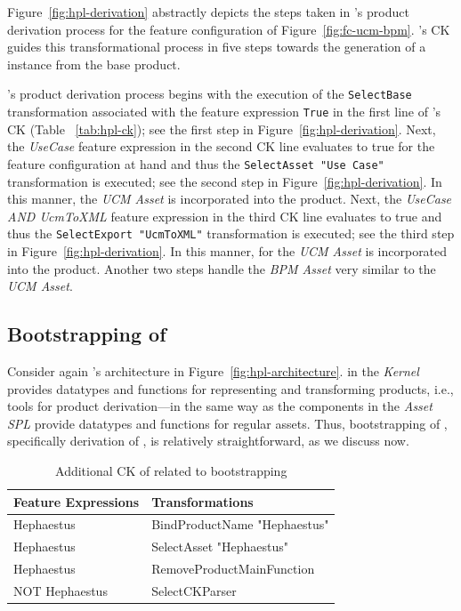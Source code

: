 
Figure~\ref{fig:hpl-derivation} abstractly depicts the steps taken in \hpl's product derivation process 
for the feature configuration of Figure~\ref{fig:fc-ucm-bpm}. \hpl{}'s CK guides this transformational process in five steps towards the generation of a \hpl{} instance from the base product.

\hpl's product derivation process begins with the execution of the \texttt{SelectBase} transformation associated with the feature expression \texttt{True} in the first line of \hpl's CK (Table ~\ref{tab:hpl-ck}); see the first step in Figure~\ref{fig:hpl-derivation}. Next, the \emph{UseCase} feature expression in the second CK line evaluates to true for the feature configuration at hand and thus the \texttt{SelectAsset "Use Case"} transformation is executed; see the second step in Figure~\ref{fig:hpl-derivation}. In this manner, the \emph{UCM Asset} is incorporated into the product. 
Next, the \emph{UseCase AND UcmToXML} feature expression in the third CK line evaluates to true and thus the \texttt{SelectExport "UcmToXML"} transformation is executed; see the third step in Figure~\ref{fig:hpl-derivation}. In this manner, \asseto{} for the \emph{UCM Asset} is incorporated into the product. Another two steps handle the \emph{BPM Asset} very similar to the \emph{UCM Asset}.


\subsection{Bootstrapping of \hpl} 
\label{sec:hpl-bootstrapping}

Consider again \hpl's architecture in Figure~\ref{fig:hpl-architecture}. \hpsplasset{} in the \emph{Kernel} provides datatypes and functions for representing and transforming \hpl{} products, i.e., tools for product derivation---in the same way as the components in the \emph{Asset SPL} provide datatypes and functions for regular assets. Thus, bootstrapping of \hpl, specifically derivation of \hpproduct, is relatively straightforward, as we discuss now.


\begin{table}[t!]
\begin{center}
\begin{tabular}{||l||l||}
  \hline
  \textbf{Feature Expressions} & \textbf{Transformations}   \\  \hline
  Hephaestus & BindProductName "Hephaestus" \\
  Hephaestus & SelectAsset "Hephaestus"   \\
  Hephaestus & RemoveProductMainFunction \\ \hline
  NOT Hephaestus & SelectCKParser \\ \hline
\end{tabular}
\caption{Additional CK of \hpl{} related to bootstrapping}
\label{tab:hplck-2}
\end{center}
\end{table}

